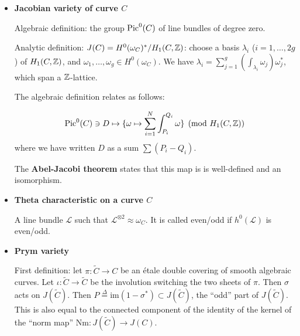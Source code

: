 \documentclass[11pt, english]{article}
\begin{document}
\begin{itemize}
	\item \textbf{Jacobian variety of curve $C$}

	Algebraic definition: the group $\operatorname{Pic}^0 (C)$ of line bundles of degree zero.

	Analytic definition: $J(C) = H^0(\omega_C)^\ast / H_1(C,\mathbb{Z})$: choose a basis $\lambda_i$ ($i=1,\ldots,2g$) of $H_1(C,\mathbb{Z})$, and $\omega_1, \ldots,\omega_g \in H^0(\omega_C)$. We have $\lambda_i = \sum_{j=1}^g (\int_{\lambda_i} \omega_j)\omega_j^\ast$, which span a $\mathbb{Z}$-lattice.

	The algebraic definition relates as follows:

	$$
	\operatorname{Pic}^0(C) \ni D \mapsto \{ \omega \mapsto \sum_{i=1}^N \int_{P_i}^{Q_i} \omega \} \pmod{H_1(C,\mathbb{Z})}
	$$
	where we have written $D$ as a sum $\sum (P_i-Q_i)$.

	The \textbf{Abel-Jacobi theorem} states that this map is is well-defined and an isomorphism.
	\item \textbf{Theta characteristic on a curve $C$}

	A line bundle $\mathcal L$ such that $\mathcal L^{\otimes 2} \approx \omega_C$. It is called even/odd if $h^0(\mathcal L)$ is even/odd.
	\item \textbf{Prym variety}

	First definition: let $\pi: \widetilde C \to C$ be an étale double covering of smooth algebraic curves. Let $\iota: \widetilde C \to \widetilde C$ be the involution switching the two sheets of $\pi$. Then $\sigma$ acts on $J(\widetilde C)$. Then $P \stackrel \Delta = \mathrm{im}(1-\sigma^\ast) \subset J(\widetilde C)$, the ``odd'' part of $J(\widetilde C)$. This is also equal to the connected component of the identity of the kernel of the ``norm map'' $\mathrm {Nm}:J(\widetilde C) \to J(C)$.
\end{itemize}
\end{document}
